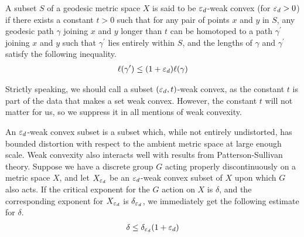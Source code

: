 \begin{definition}
  A subset $S$ of a geodesic metric space $X$ is said to be $\varepsilon_d$-weak convex (for $\varepsilon_d > 0$) if there exists a constant $t > 0$ such that for any pair of points $x$ and $y$ in $S$, any geodesic path $\gamma$ joining $x$ and $y$ longer than $t$ can be homotoped to a path $\gamma^{\prime}$ joining $x$ and $y$ such that $\gamma^{\prime}$ lies entirely within $S$, and the lengths of $\gamma$ and $\gamma^{\prime}$ satisfy the following inequality.
  \begin{align*}
    \ell(\gamma^{\prime}) \leq (1 + \varepsilon_d) \ell(\gamma)
  \end{align*}
\end{definition}

\begin{remark}
  Strictly speaking, we should call a subset $(\varepsilon_d, t)$-weak convex, as the constant $t$ is part of the data that makes a set weak convex.
  However, the constant $t$ will not matter for us, so we suppress it in all mentions of weak convexity.
\end{remark}

An $\varepsilon_d$-weak convex subset is a subset which, while not entirely undistorted, has bounded distortion with respect to the ambient metric space at large enough scale.
Weak convexity also interacts well with results from Patterson-Sullivan theory.
Suppose we have a discrete group $G$ acting properly discontinuously on a metric space $X$, and let $X_{\varepsilon_d}$ be an $\varepsilon_d$-weak convex subset of $X$ upon which $G$ also acts.
If the critical exponent for the $G$ action on $X$ is $\delta$, and the corresponding exponent for $X_{\varepsilon_d}$ is $\delta_{\varepsilon_d}$, we immediately get the following estimate for $\delta$.
\begin{align*}
  \delta \leq \delta_{\varepsilon_d} (1 + \varepsilon_d)
\end{align*}

